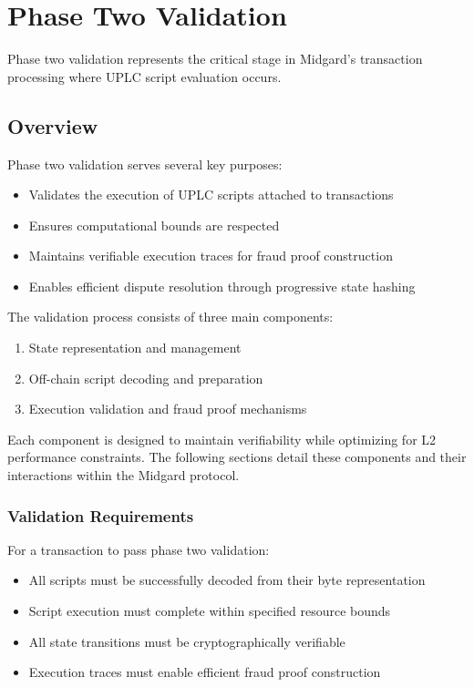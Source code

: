 \documentclass[../midgard.tex]{subfiles}
\begin{document}
\chapter{Phase Two Validation}
\label{h:phase-two-validation}

Phase two validation represents the critical stage in Midgard's transaction processing where UPLC script evaluation occurs.

\section{Overview}
\label{sec:phase-two-overview}

Phase two validation serves several key purposes:

\begin{itemize}
    \item Validates the execution of UPLC scripts attached to transactions
    \item Ensures computational bounds are respected
    \item Maintains verifiable execution traces for fraud proof construction
    \item Enables efficient dispute resolution through progressive state hashing
\end{itemize}

The validation process consists of three main components:

\begin{enumerate}
    \item State representation and management
    \item Off-chain script decoding and preparation
    \item Execution validation and fraud proof mechanisms
\end{enumerate}

Each component is designed to maintain verifiability while optimizing for L2 performance constraints. The following sections detail these components and their interactions within the Midgard protocol.

\subsection{Validation Requirements}
\label{sec:validation-requirements}

For a transaction to pass phase two validation:

\begin{itemize}
    \item All scripts must be successfully decoded from their byte representation
    \item Script execution must complete within specified resource bounds
    \item All state transitions must be cryptographically verifiable
    \item Execution traces must enable efficient fraud proof construction
\end{itemize}
\end{document}
